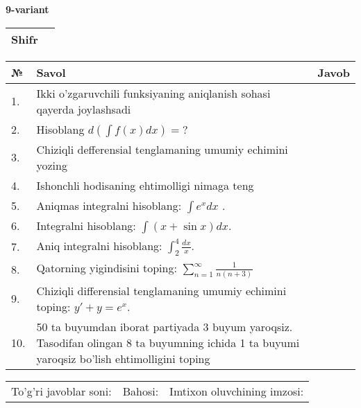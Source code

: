 \documentclass{article}
\begin{document}
  \egroup
  
  \newpage
  
  
  \textbf{9-variant}\\
  
  \bgroup
  \def\arraystretch{1.6} %
  
  \begin{tabular}{|m{5.7cm}|m{9.5cm}|}
  \hline
  Shifr & \\
  \hline
  \end{tabular}
  
  \vspace{1cm}
  
  \begin{tabular}{|m{0.7cm}|m{10cm}|m{4cm}|}
  \hline
  № & Savol & Javob \\
  \hline
  1. & Ikki o'zgaruvchili funksiyaning aniqlanish sohasi qayerda joylashsadi &  \\
  \hline
  2. & Hisoblang \(d\left( \int {f(x)dx} \right) = ?\) &  \\
  \hline
  3. & Chiziqli defferensial tenglamaning umumiy echimini yozing &  \\
  \hline
  4. & Ishonchli hodisaning ehtimolligi nimaga teng &  \\
  \hline
  5. & Aniqmas integralni hisoblang: \(\int {e^{x}dx}\) . &  \\
  \hline
  6. & Integralni hisoblang: \(\int {(x + \sin x)dx}\). &  \\
  \hline
  7. & Aniq integralni hisoblang: \(\int_{2}^{4}\frac{dx}{x}\). &  \\
  \hline
  8. & Qatorning yigindisini toping: \(\sum_{n = 1}^{\infty}\frac{1}{n(n + 3)}\) &  \\
  \hline
  9. & Chiziqli differensial tenglamaning umumiy echimini toping: \(y' + y = e^{x}\). &  \\
  \hline
  10. & 50 ta buyumdan iborat partiyada 3 buyum yaroqsiz. Tasodifan olingan 8 ta buyumning ichida 1 ta buyumi yaroqsiz bo'lish ehtimolligini toping &  \\
  \hline
  \end{tabular}
  
  \vspace{1cm}
  
  \begin{tabular}{lll}
  To'g'ri javoblar soni: \underline{\hspace{1.5cm}} & 
  Bahosi: \underline{\hspace{1.5cm}} & 
  Imtixon oluvchining imzosi: \underline{\hspace{2cm}} \\
  \end{tabular}
  
\end{document}
